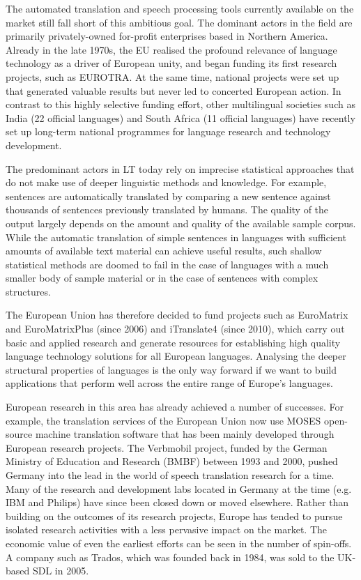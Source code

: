 \begin{multicols}{2}

    The automated translation and speech processing tools currently available on the market still fall short of this ambitious goal. The dominant actors in the field are primarily privately-owned for-profit enterprises based in Northern America. Already in the late 1970s, the EU realised the profound relevance of language technology as a driver of European unity, and began funding its first research projects, such as EUROTRA. At the same time, national projects were set up that generated valuable results but never led to concerted European action. In contrast to this highly selective funding effort, other multilingual societies such as India (22 official languages) and South Africa (11 official languages) have recently set up long-term national programmes for language research and technology development. 

    The predominant actors in LT today rely on imprecise statistical approaches that do not make use of deeper linguistic methods and knowledge. For example, sentences are automatically translated by comparing a new sentence against thousands of sentences previously translated by humans. The quality of the output largely depends on the amount and quality of the available sample corpus. While the automatic translation of simple sentences in languages with sufficient amounts of available text material can achieve useful results, such shallow statistical methods are doomed to fail in the case of languages with a much smaller body of sample material or in the case of sentences with complex structures.

    The European Union has therefore decided to fund projects such as EuroMatrix and EuroMatrixPlus (since 2006) and iTranslate4 (since 2010), which carry out basic and applied research and generate resources for establishing high quality language technology solutions for all European languages. Analysing the deeper structural properties of languages is the only way forward if we want to build applications that perform well across the entire range of Europe’s languages.

    European research in this area has already achieved a number of successes. For example, the translation services of the European Union now use MOSES open-source machine translation software that has been mainly developed through European research projects. The Verbmobil project, funded by the German Ministry of Education and Research (BMBF) between 1993 and 2000, pushed Germany into the lead in the world of speech translation research for a time. Many of the research and development labs located in Germany at the time (e.g. IBM and Philips) have since been closed down or moved elsewhere. Rather than building on the outcomes of its research projects, Europe has tended to pursue isolated research activities with a less pervasive impact on the market. The economic value of even the earliest efforts can be seen in the number of spin-offs. A company such as Trados, which was founded back in 1984, was sold to the UK-based SDL in 2005.


\end{multicols}
